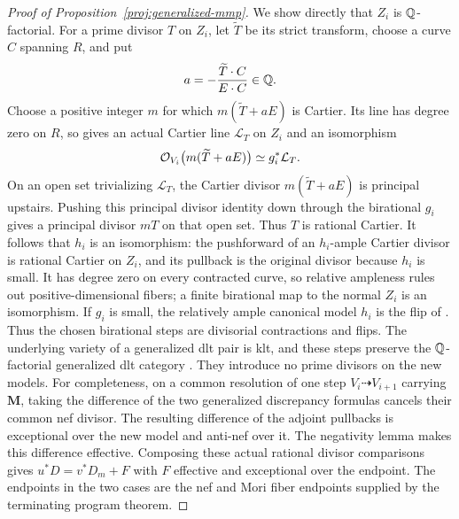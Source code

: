 \begin{proof}[Proof of Proposition~\ref{proj:generalized-mmp}]
We show directly that \(Z_i\) is \(\mathbb Q\)-factorial.  For a prime divisor
\(T\) on \(Z_i\), let \(\widetilde T\) be its strict transform, choose a
curve \(C\) spanning \(R\), and put
\[
                 a=-\frac{\widetilde T\cdot C}{E\cdot C}\in\mathbb Q.
\]
Choose a positive integer \(m\) for which \(m(\widetilde T+aE)\) is
Cartier.  Its line has degree zero on \(R\), so
\cite[Theorem~1.5]{Xie2022} gives an actual Cartier line \(\mathcal L_T\)
on \(Z_i\) and an isomorphism
\[
 \mathcal O_{V_i}\bigl(m(\widetilde T+aE)\bigr)\simeq g_i^*\mathcal L_T.
\]
On an open set trivializing \(\mathcal L_T\), the Cartier divisor
\(m(\widetilde T+aE)\) is principal upstairs.  Pushing this principal
divisor identity down through the birational \(g_i\) gives a principal
divisor \(mT\) on that open set.
Thus \(T\) is rational Cartier.  It follows that \(h_i\) is an isomorphism:
the pushforward of an \(h_i\)-ample Cartier divisor is rational Cartier
on \(Z_i\), and its pullback is the original divisor because \(h_i\)
is small.  It has degree zero on every contracted curve, so relative
ampleness rules out positive-dimensional fibers; a finite birational
map to the normal \(Z_i\) is an isomorphism.  If \(g_i\) is small,
the relatively ample canonical model \(h_i\) is the flip of
\cite[Definition~3.2]{HanLi}.  Thus the chosen birational steps are
divisorial contractions and flips.  The underlying variety of a
generalized dlt pair is klt, and these steps preserve the
\(\mathbb Q\)-factorial generalized dlt category
\cite[Remark~2.3 and Lemma~3.7]{HanLi}.  They introduce no prime
divisors on the new models. For completeness, on a common resolution
of one step \(V_i\dashrightarrow V_{i+1}\) carrying \(\boldsymbol M\),
taking the difference of the two generalized discrepancy formulas cancels
their common nef divisor. The resulting difference of the adjoint pullbacks is exceptional over the new
model and anti-nef over it. The negativity lemma makes this difference
effective. Composing these actual rational divisor comparisons gives
\(u^*D=v^*D_m+F\) with \(F\) effective and exceptional over the endpoint.
The endpoints in the two cases are the nef and Mori fiber endpoints supplied
by the terminating program theorem.
\end{proof}

